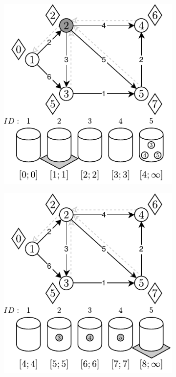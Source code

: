 \begin{figure}[!htbp]
\begin{subfigure}[b]{0.33\textwidth}
		\caption{}
	\end{subfigure}
	\begin{subfigure}[b]{0.33\textwidth}
		\includegraphics[width=\textwidth]{Chapter_II/1/c.pdf}
		\caption{}
	\end{subfigure}
	\begin{subfigure}[b]{0.33\textwidth}
		\includegraphics[width=\textwidth]{Chapter_II/1/d.pdf}

\end{subfigure}
\end{figure}
